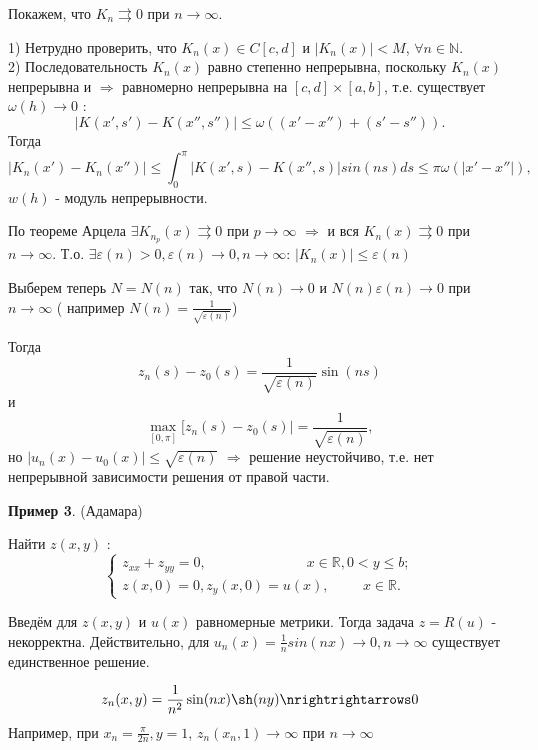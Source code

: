\documentclass{article}
\begin{document}
Покажем, что $K_n \rightrightarrows 0$ при $n \rightarrow \infty $.

1) Нетрудно проверить, что $K_n(x) \in C[c,d]$ и $|K_n(x)| < M$, $\forall n \in \mathbb{N}$.\\

2) Последовательность $K_n(x)$ равно степенно непрерывна, поскольку $K_n(x)$ непрерывна и $\Rightarrow$ равномерно непрерывна на $[c,d] \times [a,b]$, 
т.е. существует $ \omega(h) \rightarrow 0 $ : 
$$
|K(x',s') - K(x'',s'')| \leqslant \omega ((x' - x'') + (s' - s'')).
$$ 
Тогда 
$$
|K_n(x') - K_n(x'')| \leqslant \int_0^{\pi} |K(x',s) - K(x'',s)| sin (ns) ds \leqslant \pi \omega (|x' - x''|),
$$
$w(h)$ - модуль непрерывности.

По теореме Арцела $\exists K_{n_p}(x) \rightrightarrows 0$ при $p \rightarrow \infty $ $\Rightarrow$ и вся $K_n(x) \rightrightarrows 0$ при $n \rightarrow \infty $.
 Т.о. $\exists \varepsilon(n) > 0, \varepsilon (n) \rightarrow 0, n \rightarrow \infty $: $|K_n(x)| \leqslant \varepsilon(n)$

Выберем теперь $N = N(n)$ так, что $N(n) \rightarrow 0$ и $N(n)\varepsilon(n) \rightarrow 0$ при $n \rightarrow \infty $ ( например $N(n) = \frac{1}{\sqrt{\varepsilon (n)}}$)

Тогда 
$$
z_n(s) - z_0(s) = \frac{1}{\sqrt{\varepsilon (n)}} \sin(ns)
$$
и 
$$
\max_{[0,\pi]}[z_n(s) - z_0(s)| = \frac{1}{\sqrt{\varepsilon (n)}},
$$ 
но $|u_n(x) - u_0(x)| \leqslant \sqrt{\varepsilon (n)}$ $\Rightarrow$ решение неустойчиво, т.е. нет непрерывной зависимости решения от правой части.

\textbf{Пример 3}. (Адамара)

Найти $z(x,y)$ : 
$$
\begin{cases} 
z_{xx} + z_{yy} = 0, \hspace{3cm} x \in \mathbb{R}, 0 < y \leqslant b;\\

z(x,0)=0, z_y(x,0) = u(x), \hspace{1cm} x \in \mathbb{R}.
\end{cases}
$$

Введём для $z(x,y)$ и $u(x)$ равномерные метрики. Тогда задача $z = R(u)$ - некорректна. Действительно, для $ u_n(x) = \frac{1}{n} sin(nx) \rightarrow 0, n \rightarrow \infty $ существует единственное решение.

$$
z_n(x,y) = \frac{1}{n^2} \sin(nx) \sh(ny) \nrightrightarrows 0
$$ 
Например, при $x_n = \frac{\pi}{2n}, y =1$, $z_n(x_n, 1) \rightarrow \infty $ при $n \rightarrow \infty $
\end{document}
